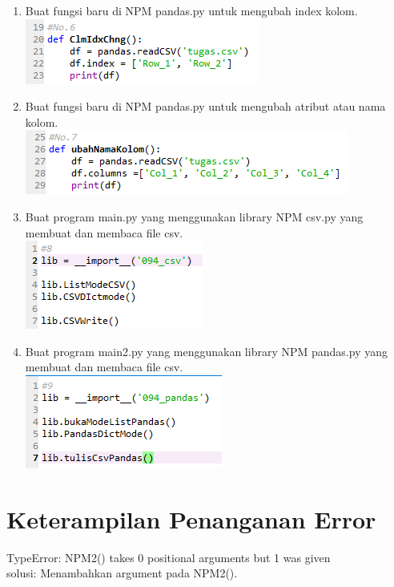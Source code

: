 \begin{enumerate}
\item Buat fungsi baru di NPM pandas.py untuk mengubah index kolom.\\ 
\includegraphics{gambar/csv12.png}
\item Buat fungsi baru di NPM pandas.py untuk mengubah atribut atau nama kolom.\\ 
\includegraphics{gambar/csv13.png}
\item Buat program  main.py yang menggunakan library NPM csv.py yang membuat dan membaca file csv.\\ 
\includegraphics{gambar/csv14.png}
\item Buat program  main2.py yang menggunakan library NPM pandas.py yang membuat dan membaca file csv.\\ 
\includegraphics{gambar/csv15.png}

\end{enumerate}

\section{Keterampilan Penanganan Error}
TypeError: NPM2() takes 0 positional arguments but 1 was given \\
solusi: Menambahkan argument pada NPM2().\\

